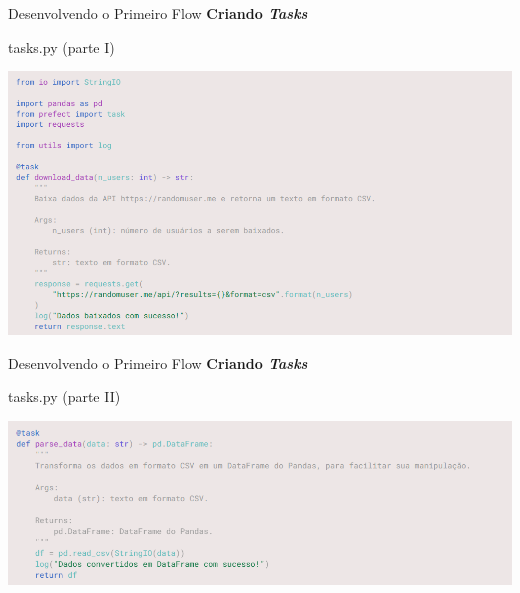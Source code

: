 \documentclass[t,serif]{beamer}
\begin{document}
	\begin{frame}{Desenvolvendo o Primeiro Flow}
		\textbf{Criando \textit{Tasks}}
		\begin{block}{tasks.py (parte I)}
			\begin{center}
				\includegraphics[width=\linewidth]{figs/2_8.png}
			\end{center}
		\end{block}
	\end{frame}
	
	\begin{frame}{Desenvolvendo o Primeiro Flow}
		\textbf{Criando \textit{Tasks}}
		\begin{block}{tasks.py (parte II)}
			\begin{center}
				\includegraphics[width=\linewidth]{figs/2_9.png}
			\end{center}
		\end{block}
	\end{frame}
	
\end{document}
